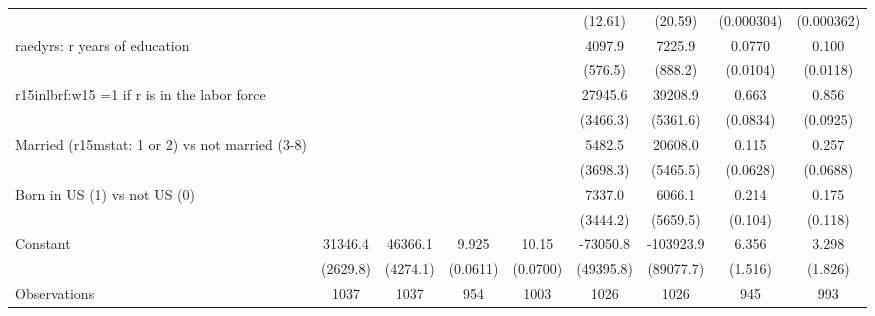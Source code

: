 \begin{table}[htbp]
\begin{tabular}{l*{8}{c}}
                &                  &                  &                  &                  &  (12.61)         &  (20.59)         &(0.000304)         &(0.000362)         \\
\addlinespace
raedyrs: r years of education&                  &                  &                  &                  &   4097.9\sym{***}&   7225.9\sym{***}&   0.0770\sym{***}&    0.100\sym{***}\\
                &                  &                  &                  &                  &  (576.5)         &  (888.2)         & (0.0104)         & (0.0118)         \\
\addlinespace
r15inlbrf:w15 =1 if r is in the labor force&                  &                  &                  &                  &  27945.6\sym{***}&  39208.9\sym{***}&    0.663\sym{***}&    0.856\sym{***}\\
                &                  &                  &                  &                  & (3466.3)         & (5361.6)         & (0.0834)         & (0.0925)         \\
\addlinespace
Married (r15mstat: 1 or 2) vs not married (3-8)&                  &                  &                  &                  &   5482.5         &  20608.0\sym{***}&    0.115\sym{*}  &    0.257\sym{***}\\
                &                  &                  &                  &                  & (3698.3)         & (5465.5)         & (0.0628)         & (0.0688)         \\
\addlinespace
Born in US (1) vs not US (0)&                  &                  &                  &                  &   7337.0\sym{**} &   6066.1         &    0.214\sym{**} &    0.175         \\
                &                  &                  &                  &                  & (3444.2)         & (5659.5)         &  (0.104)         &  (0.118)         \\
\addlinespace
Constant        &  31346.4\sym{***}&  46366.1\sym{***}&    9.925\sym{***}&    10.15\sym{***}& -73050.8         &-103923.9         &    6.356\sym{***}&    3.298\sym{*}  \\
                & (2629.8)         & (4274.1)         & (0.0611)         & (0.0700)         &(49395.8)         &(89077.7)         &  (1.516)         &  (1.826)         \\
\midrule
Observations    &     1037         &     1037         &      954         &     1003         &     1026         &     1026         &      945         &      993         \\

\end{tabular}
\end{table}
